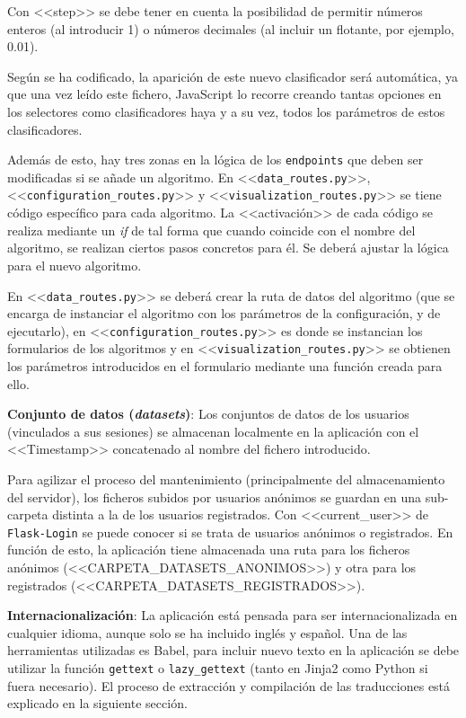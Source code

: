 Con <<step>> se debe tener en cuenta la posibilidad de permitir números enteros
(al introducir 1) o números decimales (al incluir un flotante, por ejemplo,
0.01).

Según se ha codificado, la aparición de este nuevo clasificador será automática,
ya que una vez leído este fichero, JavaScript lo recorre creando tantas opciones
en los selectores como clasificadores haya y a su vez, todos los parámetros de
estos clasificadores.

Además de esto, hay tres zonas en la lógica de los \texttt{endpoints} que deben
ser modificadas si se añade un algoritmo. En <<\texttt{data\_routes.py}>>,
<<\texttt{configuration\_routes.py}>> y <<\texttt{visualization\_routes.py}>> se
tiene código específico para cada algoritmo. La <<activación>> de cada código se
realiza mediante un \textit{if} de tal forma que cuando coincide con el nombre
del algoritmo, se realizan ciertos pasos concretos para él. Se deberá ajustar la
lógica para el nuevo algoritmo.

En <<\texttt{data\_routes.py}>> se deberá crear la ruta de datos del algoritmo
(que se encarga de instanciar el algoritmo con los parámetros de la
configuración, y de ejecutarlo), en <<\texttt{configuration\_routes.py}>> es
donde se instancian los formularios de los algoritmos y en
<<\texttt{visualization\_routes.py}>> se obtienen los parámetros introducidos en
el formulario mediante una función creada para ello.

\textbf{Conjunto de datos (\textit{datasets})}: Los conjuntos de datos de los
usuarios (vinculados a sus sesiones) se almacenan localmente en la aplicación
con el <<Timestamp>> concatenado al nombre del fichero introducido.

Para agilizar el proceso del mantenimiento (principalmente del almacenamiento
del servidor), los ficheros subidos por usuarios anónimos se guardan en una
sub-carpeta distinta a la de los usuarios registrados. Con <<current\_user>> de
\texttt{Flask-Login} se puede conocer si se trata de usuarios anónimos o
registrados. En función de esto, la aplicación tiene almacenada una ruta para
los ficheros anónimos (<<CARPETA\_DATASETS\_ANONIMOS>>) y otra para los
registrados (<<CARPETA\_DATASETS\_REGISTRADOS>>).

\textbf{Internacionalización}: La aplicación está pensada para ser
internacionalizada en cualquier idioma, aunque solo se ha incluido inglés y
español. Una de las herramientas utilizadas es Babel, para incluir nuevo texto
en la aplicación se debe utilizar la función \texttt{gettext} o
\texttt{lazy\_gettext} (tanto en Jinja2 como Python si fuera necesario). El
proceso de extracción y compilación de las traducciones está explicado en la
siguiente sección.

